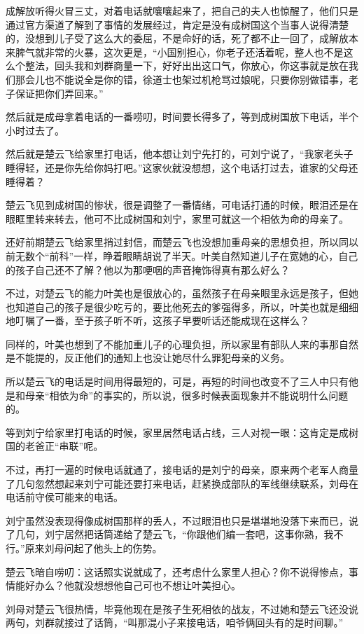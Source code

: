 成解放听得火冒三丈，对着电话就嚷嚷起来了，把自己的夫人也惊醒了，他们只是通过官方渠道了解到了事情的发展经过，肯定是没有成树国这个当事人说得清楚的，没想到儿子受了这么大的委屈，不是命好的话，死了都不止一回了，成解放本来脾气就非常的火暴，这次更是，“小国别担心，你老子还活着呢，整人也不是这么个整法，回头我和刘群商量一下，好好出出这口气，你放心，你这事就是放在我们那会儿也不能说全是你的错，徐道士也架过机枪骂过娘呢，只要你别做错事，老子保证把你们弄回来。”

然后就是成母拿着电话的一番唠叨，时间要长得多了，等到成树国放下电话，半个小时过去了。

然后就是楚云飞给家里打电话，他本想让刘宁先打的，可刘宁说了，“我家老头子睡得轻，还是你先给你妈打吧。”这家伙就没想想，这个电话打过去，谁家的父母还睡得着？

楚云飞见到成树国的惨状，很是调整了一番情绪，可电话打通的时候，眼泪还是在眼眶里转来转去，他可不比成树国和刘宁，家里可就这一个相依为命的母亲了。

还好前期楚云飞给家里捎过封信，而楚云飞也没想加重母亲的思想负担，所以同以前无数个“前科”一样，睁着眼睛胡说了半天。叶美自然知道儿子在宽她的心，自己的孩子自己还不了解？他以为那哽咽的声音掩饰得真有那么好么？

不过，对楚云飞的能力叶美也是很放心的，虽然孩子在母亲眼里永远是孩子，但她也知道自己的孩子是很少吃亏的，要比他死去的爹强得多，所以，叶美也就是细细地叮嘱了一番，至于孩子听不听，这孩子早要听话还能成现在这样么？

同样的，叶美也想到了不能加重儿子的心理负担，所以家里有部队人来的事那自然是不能提的，反正他们的通知上也没让她尽什么罪犯母亲的义务。

所以楚云飞的电话是时间用得最短的，可是，再短的时间也改变不了三人中只有他是和母亲“相依为命”的事实的，所以说，很多时候表面现象并不能说明什么问题的。

等到刘宁给家里打电话的时候，家里居然电话占线，三人对视一眼：这肯定是成树国的老爸正“串联”呢。

不过，再打一遍的时候电话就通了，接电话的是刘宁的母亲，原来两个老军人商量了几句忽然想起来刘宁可能还要打来电话，赶紧换成部队的军线继续联系，刘母在电话前守侯可能来的电话。

刘宁虽然没表现得像成树国那样的丢人，不过眼泪也只是堪堪地没落下来而已，说了几句，刘宁居然把话筒递给了楚云飞，“你跟他们编一套吧，这事你熟，我不行。”原来刘母问起了他头上的伤势。

楚云飞暗自唠叨：这话照实说就成了，还考虑什么家里人担心？你不说得惨点，事情能好办么？他就没想想他自己可也不想让叶美担心。

刘母对楚云飞很热情，毕竟他现在是孩子生死相依的战友，不过她和楚云飞还没说两句，刘群就接过了话筒，“叫那混小子来接电话，咱爷俩回头有的是时间聊。”

